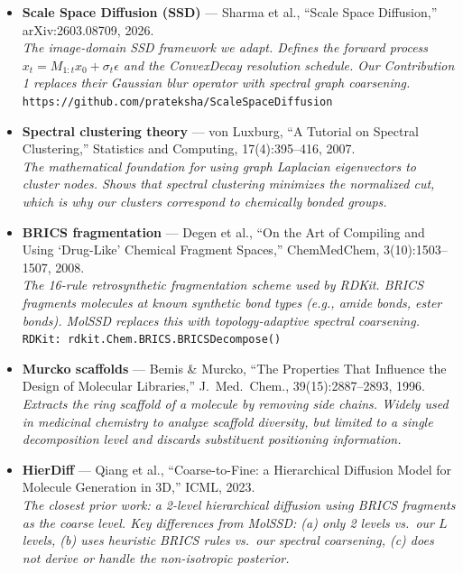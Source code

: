\documentclass[12pt,a4paper]{article}
\begin{document}
\begin{itemize}[leftmargin=*, itemsep=3pt]
  \item \textbf{Scale Space Diffusion (SSD)} --- Sharma et al., ``Scale Space Diffusion,'' arXiv:2603.08709, 2026. \\
    \textit{The image-domain SSD framework we adapt. Defines the forward process $x_t = M_{1:t} x_0 + \sigma_t \epsilon$ and the ConvexDecay resolution schedule. Our Contribution 1 replaces their Gaussian blur operator with spectral graph coarsening.}
    \\\texttt{https://github.com/prateksha/ScaleSpaceDiffusion}

  \item \textbf{Spectral clustering theory} --- von Luxburg, ``A Tutorial on Spectral Clustering,'' Statistics and Computing, 17(4):395--416, 2007. \\
    \textit{The mathematical foundation for using graph Laplacian eigenvectors to cluster nodes. Shows that spectral clustering minimizes the normalized cut, which is why our clusters correspond to chemically bonded groups.}

  \item \textbf{BRICS fragmentation} --- Degen et al., ``On the Art of Compiling and Using `Drug-Like' Chemical Fragment Spaces,'' ChemMedChem, 3(10):1503--1507, 2008. \\
    \textit{The 16-rule retrosynthetic fragmentation scheme used by RDKit. BRICS fragments molecules at known synthetic bond types (e.g., amide bonds, ester bonds). MolSSD replaces this with topology-adaptive spectral coarsening.}
    \\\texttt{RDKit: rdkit.Chem.BRICS.BRICSDecompose()}

  \item \textbf{Murcko scaffolds} --- Bemis \& Murcko, ``The Properties That Influence the Design of Molecular Libraries,'' J.\ Med.\ Chem., 39(15):2887--2893, 1996. \\
    \textit{Extracts the ring scaffold of a molecule by removing side chains. Widely used in medicinal chemistry to analyze scaffold diversity, but limited to a single decomposition level and discards substituent positioning information.}

  \item \textbf{HierDiff} --- Qiang et al., ``Coarse-to-Fine: a Hierarchical Diffusion Model for Molecule Generation in 3D,'' ICML, 2023. \\
    \textit{The closest prior work: a 2-level hierarchical diffusion using BRICS fragments as the coarse level. Key differences from MolSSD: (a) only 2 levels vs.\ our $L$ levels, (b) uses heuristic BRICS rules vs.\ our spectral coarsening, (c) does not derive or handle the non-isotropic posterior.}


\end{itemize}
\end{document}
